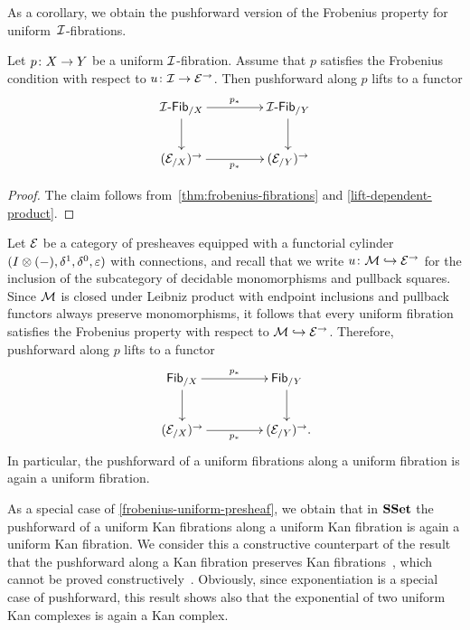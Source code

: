 \documentclass[reqno,10pt,a4paper,oneside,draft]{amsart}
\begin{document}
As a corollary, we obtain the pushforward version of the Frobenius property for uniform~$\cal{I}$-fibrations.

\begin{corollary}
Let $p \co X \to Y$ be a uniform $\cal{I}$-fibration.
Assume that $p$ satisfies the Frobenius condition with respect to $u \co \cal{I}
\to \cal{E}^\to$. Then pushforward along $p$ lifts to a functor
\[
\xymatrix@C+2em{
  \Fib{\cal{I}}_{/X} \ar[r]^{p_*} \ar[d] & \Fib{\cal{I}}_{/Y} \ar[d] \\
  (\cal{E}_{/X})^\to \ar[r]_{p_*} & (\cal{E}_{/Y})^\to
}
\]
\end{corollary}

\begin{proof} The claim follows from~\cref{thm:frobenius-fibrations} and \cref{lift-dependent-product}.
\end{proof}

\begin{example} \label{frobenius-uniform-presheaf} Let $\catE$ be a category of presheaves equipped with a functorial cylinder $( \interval \otimes (-), \rcyl, \lcyl, \ccyl)$ with connections, and recall that we write $u \co \cal{M} \hookrightarrow \catE^\to$ for the inclusion of the subcategory of decidable monomorphisms and pullback squares.
Since $\cal{M}$ is closed under Leibniz product with endpoint inclusions and pullback functors always preserve monomorphisms, it follows that every uniform fibration satisfies the Frobenius property with respect to
$\cal{M} \hookrightarrow \catE^\to$. Therefore, pushforward along $p$ lifts to a functor
\[
\xymatrix@C+2em{
  \mathsf{Fib}_{/X} \ar[r]^{p_*} \ar[d]_{} & \mathsf{Fib}_{/Y} \ar[d] \\
  (\cal{E}_{/X})^\to \ar[r]_{p_*} & (\cal{E}_{/Y})^\to \rlap{.}
}
\]
In particular, the pushforward of a uniform fibrations along a uniform fibration is again a uniform fibration.
\end{example}

\begin{example} As a special case of \cref{frobenius-uniform-presheaf}, we obtain that in $\SSet$ the pushforward of a uniform Kan fibrations along a uniform Kan fibration is again a uniform Kan fibration.
We consider this a constructive counterpart of the result that the pushforward along a Kan fibration preserves Kan fibrations~\cite{voevodsky-simplicial-model}, which cannot be proved constructively~\cite{coquand-non-constructivity-kan}.
Obviously, since exponentiation is a special case of pushforward, this result shows also that the exponential of two uniform Kan complexes is again a Kan complex.
\end{example}
\end{document}
